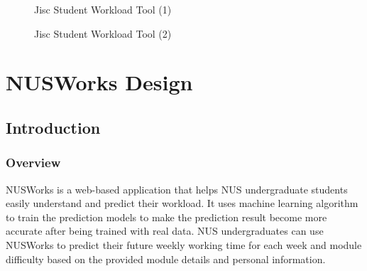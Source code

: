 \documentclass[fyp]{socreport}
\begin{document}
\begin{figure}
\caption{Jisc Student Workload Tool (1)}
\label{open-1}
\end{figure}

\begin{figure}
\caption{Jisc Student Workload Tool (2)}
\label{open-2}
\end{figure}

\chapter{NUSWorks Design}
\section{Introduction}
\subsection{Overview}
NUSWorks is a web-based application that helps NUS undergraduate students easily understand and predict their workload. It uses machine learning algorithm to train the prediction models to make the prediction result become more accurate after being trained with real data. NUS undergraduates can use NUSWorks to predict their future weekly working time for each week and module difficulty based on the provided module details and personal information.
\end{document}
